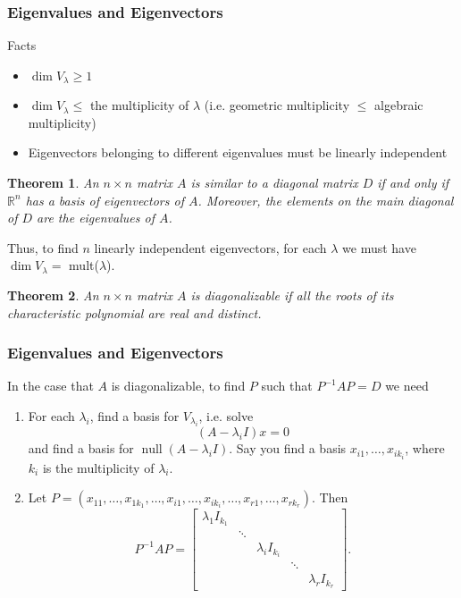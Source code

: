 \documentclass{beamer}
\newtheorem{thm}{Theorem}
\theoremstyle{definition}
\newcommand{\R}{\mathbb{R}}
\newcommand{\inv}{^{-1}}
\renewcommand{\=}{&=&}
\newcommand{\<}{\langle}
\renewcommand{\>}{\rangle}
\newcommand{\bmat}{\begin{bmatrix}}
\newcommand{\emat}{\end{bmatrix}}
\DeclareMathOperator{\nullsp}{null}
\begin{document}
\begin{frame}[t]
\frametitle{Eigenvalues and Eigenvectors}
\begin{block}{Facts}
\begin{itemize}
	\item $\dim V_\lambda \ge 1$
	\item $\dim V_\lambda \le$ the multiplicity of $\lambda$ (i.e. geometric multiplicity $\le$
	algebraic multiplicity)
	\item Eigenvectors belonging to different eigenvalues must be linearly independent
\end{itemize}
\end{block}
\pause
\vspace{-5mm}
\begin{thm}
An $n \times n$ matrix $A$ is similar to a diagonal matrix $D$ if and only if $\R^n$ has a basis of
eigenvectors of $A$. Moreover, the elements on the main diagonal of $D$ are the eigenvalues of
$A$.
\end{thm}
\pause
Thus, to find $n$ linearly independent eigenvectors, for each $\lambda$ we must have $\dim 
V_\lambda = $ mult($\lambda$).
\pause
\begin{thm}
An $n\times n$ matrix $A$ is diagonalizable if all the roots of its characteristic polynomial are
real and distinct.
\end{thm}
\end{frame}

\begin{frame}[t]
\frametitle{Eigenvalues and Eigenvectors}
In the case that $A$ is diagonalizable, to find $P$ such that $P\inv A P = D$ we need
\begin{enumerate}
	\item For each $\lambda_i$, find a basis for $V_{\lambda_i}$, i.e. solve
	\[
		(A-\lambda_i I) x = 0
	\]
	and find a basis for $\nullsp(A-\lambda_i I)$. Say you find a basis $x_{i1}, \ldots, x_{ik_i}$,
	where $k_i$ is the multiplicity of $\lambda_i$.
	
	\item Let $P = (x_{11}, \ldots, x_{1k_1}, \ldots, x_{i1}, \ldots, x_{ik_i}, \ldots, x_{r1}, \ldots, 
	x_{rk_r})$. Then
	\[
		P\inv A P = \bmat 
		\lambda_1 I_{k_1} & & & &\\
		& \ddots & & & \\
		& & \lambda_i I_{k_i} & & \\
		& & & \ddots & \\
		& & & & \lambda_r I_{k_r}
		\emat.
	\]
\end{enumerate}
\end{frame}
\end{document}
